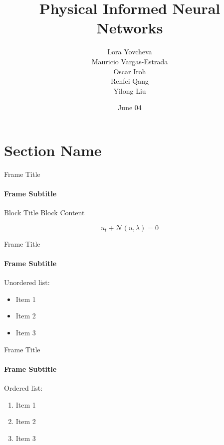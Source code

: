 \documentclass{beamer}
\title{Physical Informed Neural Networks}
\date{June 04}
\author{Lora Yovcheva\\
Mauricio Vargas-Estrada\\
Oscar Iroh\\
Renfei Qang\\
Yilong Liu}
\begin{document}
\insertTitleSlide

\section{Section Name}

\begin{frame}{Frame Title}
\framesubtitle{Frame Subtitle} 
    \begin{block}{Block Title}
        Block Content

        \begin{equation}
            u_t + \mathcal{N}(u, \lambda) = 0
        \end{equation}
    \end{block}
\end{frame}

\begin{frame}{Frame Title}
\framesubtitle{Frame Subtitle} 

Unordered list:

\begin{itemize}
    \item Item 1
    \item Item 2
    \item Item 3
\end{itemize}
\end{frame}

\begin{frame}{Frame Title}
\framesubtitle{Frame Subtitle} 

Ordered list:

\begin{enumerate}
    \item Item 1
    \item Item 2
    \item Item 3
\end{enumerate}

\end{frame}

\insertLastSlide
\end{document}
